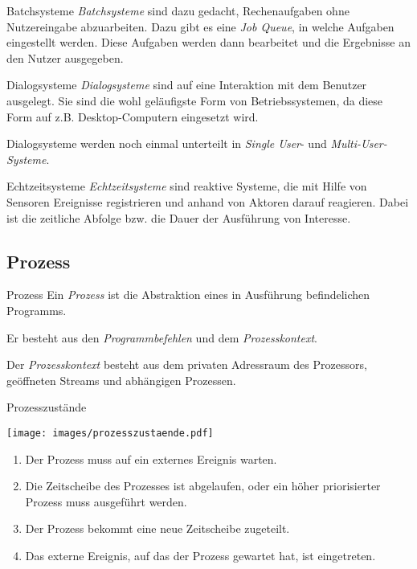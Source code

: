 \documentclass[german]{../spicker}
\begin{document}
\begin{bonus}{Batchsysteme}
    \emph{Batchsysteme} sind dazu gedacht, Rechenaufgaben ohne Nutzereingabe abzuarbeiten.
    Dazu gibt es eine \emph{Job Queue}, in welche Aufgaben eingestellt werden.
    Diese Aufgaben werden dann bearbeitet und die Ergebnisse an den Nutzer ausgegeben.
\end{bonus}

\begin{bonus}{Dialogsysteme}
    \emph{Dialogsysteme} sind auf eine Interaktion mit dem Benutzer ausgelegt.
    Sie sind die wohl geläufigste Form von Betriebssystemen, da diese Form auf z.B. Desktop-Computern eingesetzt wird.

    Dialogsysteme werden noch einmal unterteilt in \emph{Single User}- und \emph{Multi-User-Systeme}.
\end{bonus}

\begin{bonus}{Echtzeitsysteme}
    \emph{Echtzeitsysteme} sind reaktive Systeme, die mit Hilfe von Sensoren Ereignisse registrieren und anhand von Aktoren darauf reagieren.
    Dabei ist die zeitliche Abfolge bzw. die Dauer der Ausführung von Interesse.
\end{bonus}

\subsection{Prozess}

\begin{defi}{Prozess}
    Ein \emph{Prozess} ist die Abstraktion eines in Ausführung befindelichen Programms.

    Er besteht aus den \emph{Programmbefehlen} und dem \emph{Prozesskontext}.

    Der \emph{Prozesskontext} besteht aus dem privaten Adressraum des Prozessors, geöffneten Streams und abhängigen Prozessen.
\end{defi}

\begin{defi}{Prozesszustände}
    \begin{center}
        \texttt{[image: images/prozesszustaende.pdf]}
    \end{center}
    \begin{enumerate}
        \item Der Prozess muss auf ein externes Ereignis warten.
        \item Die Zeitscheibe des Prozesses ist abgelaufen, oder ein höher priorisierter Prozess muss ausgeführt werden.
        \item Der Prozess bekommt eine neue Zeitscheibe zugeteilt.
        \item Das externe Ereignis, auf das der Prozess gewartet hat, ist eingetreten.
    \end{enumerate}
\end{defi}
\end{document}
